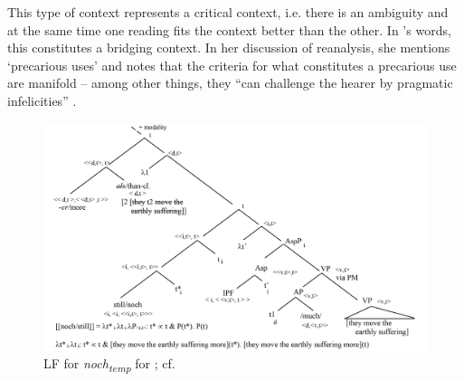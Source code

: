 \documentclass[output=paper
,modfonts
,nonflat]{langsci/langscibook}
\begin{document}
This type of context represents a critical context, i.e. there is an ambiguity and at the same time one reading fits the context better than the other. In \citeauthor{Eckardt_2011}'s \citeyearpar{Eckardt_2011} words, this constitutes a bridging context. In her discussion of reanalysis, she mentions `precarious uses' and notes that the criteria for what constitutes a precarious use are manifold -- among other things, they ``can challenge the hearer by pragmatic infelicities'' \citep[44]{Eckardt_2011}.

\begin{figure}
\includegraphics[width=1\textwidth]{figures/LF1_temp_>_over_noch}
\caption{LF for \textit{noch\textsubscript{temp}} for ; cf. \citep{beck2016a_sub}}
\label{fig:LF1_temp_>_over_noch}
\end{figure}
\end{document}
